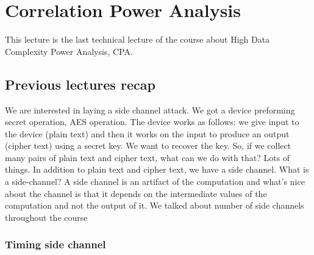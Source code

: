 \chapter{Correlation Power Analysis} \label{c8_fifthcapter}

This lecture is the last technical lecture of the course about High Data
Complexity Power Analysis, CPA.

\section{Previous lectures recap}\label{c8_prev_lectures_recap:sec}

We are interested in laying a side channel attack. We got a device preforming
secret operation, AES operation. The device works as follows: we give input to
the device (plain text) and then it works on the input to produce an output
(cipher text) using a secret key. We want to recover the key. So, if we collect
many pairs of plain text and cipher text, what can we do with that? Lots of
things. In addition to plain text and cipher text, we have a side channel. What
is a side-channel? A side channel is an artifact of the computation and what's
nice about the channel is that it depends on the intermediate values of the
computation and not the output of it. We talked about number of side channels
throughout the course

\subsection{Timing side channel}\label{c8_prev_lectures_recap_timing_sc:subsec}

